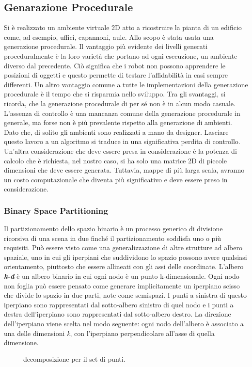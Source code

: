 \subsection{Genarazione Procedurale}
\label{ssec:generazioneproc}
Si è realizzato un ambiente virtuale 2D atto a ricostruire
la pianta di un edificio come, ad esempio, uffici, capannoni, aule. Allo scopo
è stata usata una generazione procedurale.
Il vantaggio più evidente dei livelli generati proceduralmente è la loro varietà
che portano ad ogni esecuzione, un ambiente diverso dal precedente.
Ciò significa che i robot non possono apprendere le posizioni di oggetti e
questo permette di testare l'affidabilità in casi sempre differenti.
Un altro vantaggio comune a tutte le implementazioni della generazione
procedurale è il tempo che si risparmia nello sviluppo.
Tra gli svantaggi, si ricorda, che la generazione procedurale di per sé non è
in alcun modo casuale.
L'assenza di controllo è una mancanza comune della generazione procedurale in
generale, ma forse non è più prevalente rispetto alla generazione di ambienti.
Dato che, di solito gli ambienti sono realizzati a mano da designer.
Lasciare questo lavoro a un algoritmo si traduce in una significativa perdita di
controllo.
Un'altra considerazione che deve essere presa in considerazione è la potenza di
calcolo che è richiesta, nel nostro caso, si ha solo una matrice 2D di piccole
dimensioni che deve essere generata. Tuttavia, mappe di più larga scala, avranno
un costo computazionale che diventa più significativo e deve essere preso in
considerazione.\cite{green2016procedural}

\subsubsection{Binary Space Partitioning}
\label{sssec:binaryspace}
Il partizionamento dello spazio binario è un processo generico di divisione
ricorsiva di una scena in due finché il partizionamento soddisfa uno o più
requisiti.
Può essere visto come una generalizzazione di altre strutture ad albero spaziale,
uno in cui gli iperpiani che suddividono lo spazio possono avere qualsiasi
orientamento, piuttosto che essere allineati con gli assi delle coordinate.\cite{wiki:bsp}
L'albero \textbf{\emph{k-d}} è un albero binario in cui ogni nodo è un punto
k-dimensionale. Ogni nodo non foglia può essere pensato come generare
implicitamente un iperpiano scisso che divide lo spazio in due parti, note come
semispazi. I punti a sinistra di questo iperpiano sono rappresentati dal
sotto-albero sinistro di quel nodo e i punti a destra dell'iperpiano sono
rappresentati dal sotto-albero destro. La direzione dell'iperpiano viene scelta
nel modo seguente: ogni nodo dell'albero è associato a una delle dimensioni \emph{k},
con l'iperpiano perpendicolare all'asse di quella dimensione.\cite{wiki:kdtree}

\begin{figure}[!htb]
  \centering
  \resizebox{0.7\linewidth}{!}{}
  \caption{decomposizione per il set di punti.}
  \label{fig:decomposizione}
\end{figure}
